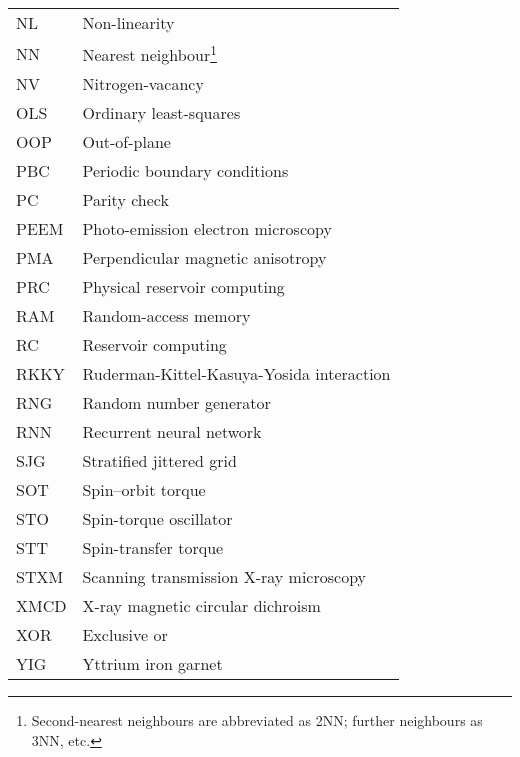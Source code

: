 {\begin{longtable}[l]{ll}
        NL    & Non-linearity                               \\
        NN    & Nearest neighbour\footnote{Second-nearest neighbours are abbreviated as 2NN; further neighbours as 3NN, etc.} \\
        NV    & Nitrogen-vacancy                            \\
        OLS   & Ordinary least-squares                      \\
        OOP   & Out-of-plane                                \\
        PBC   & Periodic boundary conditions                \\
        PC    & Parity check                                \\
        PEEM  & Photo-emission electron microscopy          \\
        PMA   & Perpendicular magnetic anisotropy           \\
        PRC   & Physical reservoir computing                \\
        RAM   & Random-access memory                        \\
        RC    & Reservoir computing                         \\
        RKKY  & Ruderman-Kittel-Kasuya-Yosida interaction   \\
        RNG   & Random number generator                     \\
        RNN   & Recurrent neural network                    \\
        SJG   & Stratified jittered grid                    \\
        SOT   & Spin--orbit torque                           \\
        STO   & Spin-torque oscillator                      \\
        STT   & Spin-transfer torque                        \\
        STXM  & Scanning transmission X-ray microscopy      \\
        XMCD  & X-ray magnetic circular dichroism           \\
        XOR   & Exclusive or                                \\
        YIG   & Yttrium iron garnet                         \\
    \end{longtable}
}
